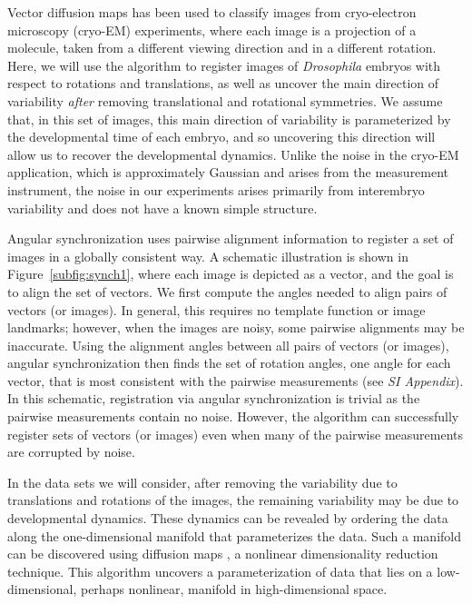 \documentclass{pnastwo}
\begin{document}
\begin{article}
Vector diffusion maps has been used to classify images from cryo-electron microscopy (cryo-EM) experiments, where each image is a projection of a molecule, taken from a different viewing direction and in a different rotation. 
%
Here, we will use the algorithm to register images of {\it Drosophila} embryos with respect to rotations and translations, as well as uncover the main direction of variability {\it after} removing translational and rotational symmetries.
%
We assume that, in this set of images, this main direction of variability is parameterized by the developmental time of each embryo, and so uncovering this direction will allow us to recover the developmental dynamics. 
%
Unlike the noise in the cryo-EM application, which is approximately Gaussian and arises from the measurement instrument, the noise in our experiments arises primarily from interembryo variability and does not have a known simple structure.

Angular synchronization uses pairwise alignment information to register a set of images in a globally consistent way.
%
A schematic illustration is shown in Figure~\ref{subfig:synch1}, where each image is depicted as a vector, and the goal is to align the set of vectors. 
%
We first compute the angles needed to align pairs of vectors (or images).
%
In general, this requires no template function or image landmarks; however, when the images are noisy, some pairwise alignments may be inaccurate.
%
Using the alignment angles between all pairs of vectors (or images), angular synchronization then finds the set of rotation angles, one angle for each vector, that is most consistent with the pairwise measurements (see {\it SI Appendix}). 
%
In this schematic, registration via angular synchronization is trivial as the pairwise measurements contain no noise. 
%
However, the algorithm can successfully register sets of vectors (or images) even when many of the pairwise measurements are corrupted by noise. 
%

%
In the data sets we will consider, after removing the variability due to translations and rotations of the images, the remaining variability may be due to developmental dynamics.
% 
These dynamics can be revealed by ordering the data along the one-dimensional manifold that parameterizes the data. 
%
Such a manifold can be discovered using diffusion maps \cite{coifman2005geometric}, a nonlinear dimensionality reduction technique.
%
This algorithm uncovers a parameterization of data that lies on a low-dimensional, perhaps nonlinear, manifold in high-dimensional space. 
%


\end{article}
\end{document}
